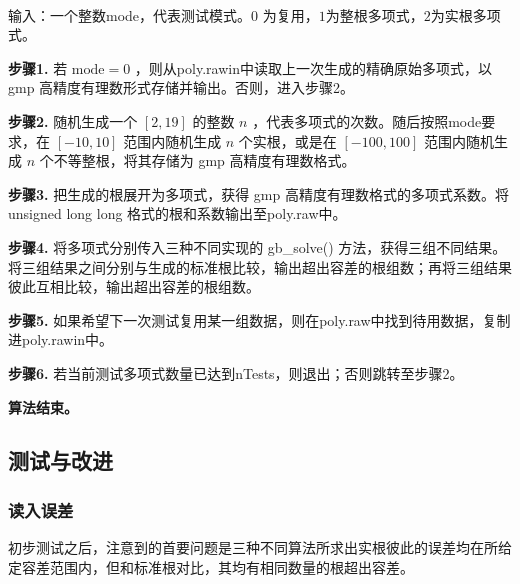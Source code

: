 	\begin{algorithm}[测试方法（简略）]~
		
		输入：一个整数mode，代表测试模式。$0$ 为复用，$1$为整根多项式，$2$为实根多项式。
		
		\textbf{步骤1.} 若 $\textrm{mode} = 0$ ，则从poly.rawin中读取上一次生成的精确原始多项式，以 gmp 高精度有理数形式存储并输出。否则，进入步骤2。
		
		\textbf{步骤2.} 随机生成一个 $[2, 19]$ 的整数 $n$ ，代表多项式的次数。随后按照mode要求，在 $[-10, 10]$ 范围内随机生成 $n$ 个实根，或是在 $[-100, 100]$ 范围内随机生成 $n$ 个不等整根，将其存储为 gmp 高精度有理数格式。
		
		\textbf{步骤3.} 把生成的根展开为多项式，获得 gmp 高精度有理数格式的多项式系数。将 unsigned long long 格式的根和系数输出至poly.raw中。
		
		\textbf{步骤4.} 将多项式分别传入三种不同实现的 gb\_solve() 方法，获得三组不同结果。将三组结果之间分别与生成的标准根比较，输出超出容差的根组数；再将三组结果彼此互相比较，输出超出容差的根组数。
		
		\textbf{步骤5.} 如果希望下一次测试复用某一组数据，则在poly.raw中找到待用数据，复制进poly.rawin中。
		
		\textbf{步骤6.} 若当前测试多项式数量已达到nTests，则退出；否则跳转至步骤2。
		
		\textbf{算法结束。}
		
		
	\end{algorithm}


\subsection{\newcontent 测试与改进}

	\subsubsection*{读入误差}

	初步测试之后，注意到的首要问题是三种不同算法所求出实根彼此的误差均在所给定容差范围内，但和标准根对比，其均有相同数量的根超出容差。
	

